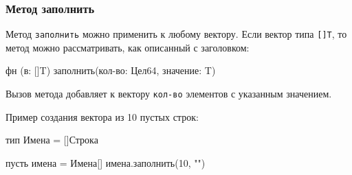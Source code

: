 \hypertarget{vector-fill}{%
\subsubsection{Метод заполнить}\label{stdfuncs:vector-fill}}

Метод \verb+заполнить+ можно применить к любому вектору. Если вектор типа \verb+[]T+, то метод можно рассматривать, как описанный с заголовком:
\begin{Trivil}
фн (в: []T) заполнить(кол-во: Цел64, значение: T) 
\end{Trivil}

Вызов метода добавляет к вектору \verb+кол-во+ элементов с указанным значением.

Пример создания вектора из 10 пустых строк:
\begin{Trivil}[vspace=2pt]
тип Имена = []Строка

пусть имена = Имена[]
имена.заполнить(10, "")
\end{Trivil}
